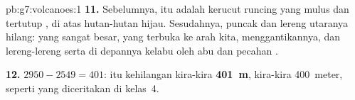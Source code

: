 \begin{solution}{pb:g7:volcanoes:1}
\textbf{11.} Sebelumnya,  itu adalah kerucut runcing yang mulus dan
tertutup , di atas hutan-hutan hijau. Sesudahnya, puncak dan lereng
utaranya hilang:  yang sangat besar, yang terbuka ke arah kita,
menggantikannya, dan lereng-lereng serta  di depannya kelabu oleh abu
dan pecahan .

\textbf{12.} $2950 - 2549 = 401$:  itu kehilangan 
kira-kira \textbf{401~m}, kira-kira 400~meter, seperti yang diceritakan di
kelas~4.
\end{solution}
